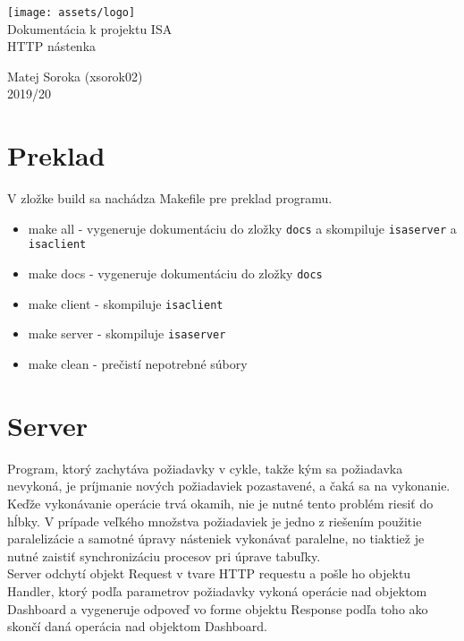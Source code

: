 \documentclass[a4paper,12pt,oneside]{article}
\theoremstyle{definition}
\theoremstyle{definition}
\theoremstyle{definition}
\begin{document}
\begin{titlepage}
  \begin{center}
    \texttt{[image: assets/logo]}\\[50mm]
    {\Huge Dokumentácia k projektu ISA}\\[5mm]
    {\Huge HTTP nástenka}\\
    \begin{flushleft}
      \Large{Matej Soroka (xsorok02) \\ 2019/20}
    \end{flushleft}
  \end{center}
\end{titlepage}

\tableofcontents
\newpage

\section{Preklad}
V zložke build sa nachádza Makefile pre preklad programu.
\begin{itemize}
  \item make all - vygeneruje dokumentáciu do zložky \texttt{docs} a skompiluje \texttt{isaserver} a \texttt{isaclient}
  \item make docs - vygeneruje dokumentáciu do zložky \texttt{docs}
  \item make client - skompiluje \texttt{isaclient}
  \item make server - skompiluje \texttt{isaserver}
  \item make clean - prečistí nepotrebné súbory
\end{itemize}

\section{Server}
Program, ktorý zachytáva požiadavky v cykle, takže kým sa požiadavka nevykoná, je príjmanie nových požiadaviek pozastavené, a čaká sa na vykonanie. Keďže vykonávanie operácie trvá okamih, nie je nutné tento problém riesiť do hĺbky. V prípade veľkého množstva požiadaviek je jedno z riešením použitie paralelizácie a samotné úpravy násteniek vykonávať paralelne, no tiaktiež je nutné zaistiť synchronizáciu procesov pri úprave tabuľky.  \\

Server odchytí objekt Request v tvare HTTP requestu a pošle ho objektu Handler, ktorý podľa parametrov požiadavky vykoná operácie nad objektom Dashboard a vygeneruje odpoveď vo forme objektu Response podľa toho ako skončí daná operácia nad objektom Dashboard. \\
\end{document}
